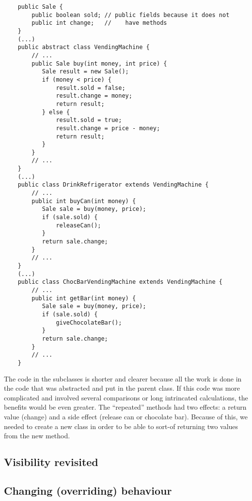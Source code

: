 \begin{verbatim}
    public Sale {
        public boolean sold; // public fields because it does not
        public int change;   //    have methods
    }
    (...)
    public abstract class VendingMachine {
        // ...
        public Sale buy(int money, int price) {
           Sale result = new Sale();
           if (money < price) {
               result.sold = false;
               result.change = money;
               return result;
           } else {
               result.sold = true;
               result.change = price - money;
               return result;
           }
        }
        // ...
    }
    (...)
    public class DrinkRefrigerator extends VendingMachine {
        // ...
        public int buyCan(int money) {
           Sale sale = buy(money, price);
           if (sale.sold) {
               releaseCan();
           } 
           return sale.change;
        }
        // ...
    }
    (...)
    public class ChocBarVendingMachine extends VendingMachine {
        // ...
        public int getBar(int money) {
           Sale sale = buy(money, price);
           if (sale.sold) {
               giveChocolateBar();
           }
           return sale.change;
        }
        // ...
    }
\end{verbatim}

The code in the subclasses is shorter and clearer because all the work
is done in the code that was abstracted and put in the parent
class. If this code was more complicated and involved several
comparisons or long intrincated calculations, the benefits would be
even greater. The ``repeated'' methods had two effects: a return value
(change) and a side effect (release can or chocolate bar). Because of
this, we needed to create a new class in order to be able to sort-of
returning two values from the new method. 

\subsection{Visibility revisited}
\label{sec:protected-keyword}



\subsection{Changing (overriding) behaviour}
\label{sec:chang-overr-behav}


